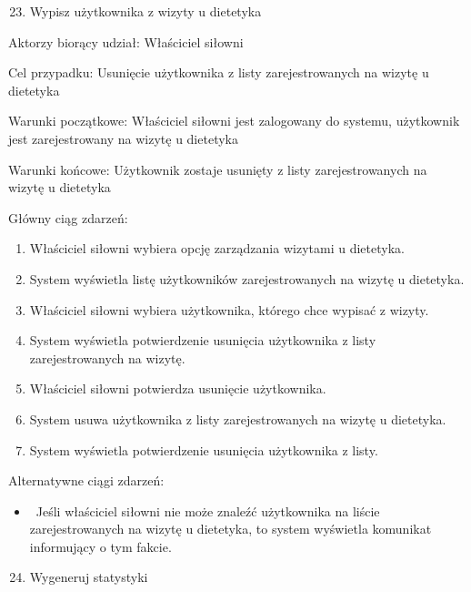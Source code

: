 \documentclass[
]{article}
\providecommand{\tightlist}{%
  \setlength{\itemsep}{0pt}\setlength{\parskip}{0pt}}
\begin{document}
{}

{}

\begin{enumerate}
\setcounter{enumi}{22}
\tightlist
\item
  {Wypisz użytkownika z wizyty u dietetyka}
\end{enumerate}

{Aktorzy biorący udział: Właściciel siłowni}

{Cel przypadku: Usunięcie użytkownika z listy zarejestrowanych na wizytę
u dietetyka}

{Warunki początkowe: Właściciel siłowni jest zalogowany do systemu,
użytkownik jest zarejestrowany na wizytę u dietetyka}

{Warunki końcowe: Użytkownik zostaje usunięty z listy zarejestrowanych
na wizytę u dietetyka}

{Główny ciąg zdarzeń:}

\begin{enumerate}
\tightlist
\item
  {Właściciel siłowni wybiera opcję zarządzania wizytami u dietetyka.}
\item
  {System wyświetla listę użytkowników zarejestrowanych na wizytę u
  dietetyka.}
\item
  {Właściciel siłowni wybiera użytkownika, którego chce wypisać z
  wizyty.}
\item
  {System wyświetla potwierdzenie usunięcia użytkownika z listy
  zarejestrowanych na wizytę.}
\item
  {Właściciel siłowni potwierdza usunięcie użytkownika.}
\item
  {System usuwa użytkownika z listy zarejestrowanych na wizytę u
  dietetyka.}
\item
  {System wyświetla potwierdzenie usunięcia użytkownika z listy.}
\end{enumerate}

{Alternatywne ciągi zdarzeń:}

\begin{itemize}
\tightlist
\item
  {~Jeśli właściciel siłowni nie może znaleźć użytkownika na liście
  zarejestrowanych na wizytę u dietetyka, to system wyświetla komunikat
  informujący o tym fakcie.}
\end{itemize}

{}

{}

{}

\begin{enumerate}
\setcounter{enumi}{23}
\tightlist
\item
  {Wygeneruj statystyki}
\end{enumerate}
\end{document}
